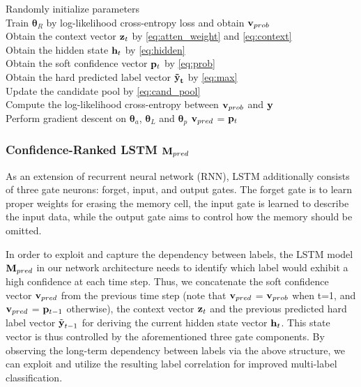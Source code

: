\documentclass[letterpaper]{article} %
\begin{document}
{\color{blue}
\begin{algorithm}[t]
\label{alg:training}
\DontPrintSemicolon
\caption{Training of Our Proposed Model}

\BlankLine
Randomly initialize parameters\\
Train $\mathbf{\theta}_R$ by log-likelihood cross-entropy loss and obtain $\mathbf{\mathbf{v}}_{prob}$\\
{
{
Obtain the context vector $\mathbf{\mathbf{z}}_t$ by \eqref{eq:atten_weight} and \eqref{eq:context}\\
Obtain the hidden state $\mathbf{\mathbf{h}}_t$ by \eqref{eq:hidden}\\
Obtain the soft confidence vector $\mathbf{\mathbf{p}}_t$ by \eqref{eq:prob}\\
Obtain the hard predicted label vector $\mathbf{\tilde{\textbf{y}}_t}$ by \eqref{eq:max}\\
Update the candidate pool by \eqref{eq:cand_pool}\\
Compute the log-likelihood cross-entropy between $\mathbf{\mathbf{v}}_{prob}$ and $\mathbf{\textbf{y}}$\\
Perform gradient descent on $\mathbf{\theta}_a$, $\mathbf{\theta}_L$ and $\mathbf{\theta}_p$
$\mathbf{\mathbf{v}}_{pred}$ = $\mathbf{\mathbf{p}}_t$
}
}
\end{algorithm}
}

\subsubsection{Confidence-Ranked LSTM $\mathbf{M}_{pred}$}
\label{LSTM}
As an extension of recurrent neural network (RNN), LSTM additionally consists of three gate neurons: forget, input, and output gates. The forget gate is to learn proper weights for erasing the memory cell, the input gate is learned to describe the input data, while the output gate aims to control how the memory should be omitted.

In order to exploit and capture the dependency between labels, the LSTM model $\mathbf{M}_{pred}$ in our network architecture needs to identify which label would exhibit a high confidence at each time step. Thus, we concatenate the soft confidence vector $\mathbf{v}_{pred}$ from the previous time step (note that $\mathbf{v}_{pred}$ = $\mathbf{v}_{prob}$ when t=1, and $\mathbf{v}_{pred}$ = $\mathbf{p}_{t-1}$ otherwise), the context vector $\mathbf{z}_t$ and the previous predicted hard label vector $\tilde{\textbf{y}}_{t-1}$ for deriving the current hidden state vector $\mathbf{h}_t$. This state vector is thus controlled by the aforementioned three gate components. By observing the long-term dependency between labels via the above structure, we can exploit and utilize the resulting label correlation for improved multi-label classification.
\end{document}
